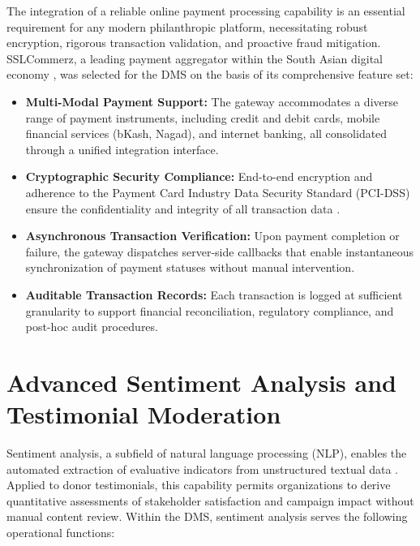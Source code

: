 \documentclass{thesis-library}
\begin{document}
The integration of a reliable online payment processing capability is an essential requirement for any modern philanthropic platform, necessitating robust encryption, rigorous transaction validation, and proactive fraud mitigation. SSLCommerz, a leading payment aggregator within the South Asian digital economy \cite{hossain2019e}, was selected for the DMS on the basis of its comprehensive feature set:
\begin{itemize}
    \item \textbf{Multi-Modal Payment Support:} The gateway accommodates a diverse range of payment instruments, including credit and debit cards, mobile financial services (bKash, Nagad), and internet banking, all consolidated through a unified integration interface.
    \item \textbf{Cryptographic Security Compliance:} End-to-end encryption and adherence to the Payment Card Industry Data Security Standard (PCI-DSS) ensure the confidentiality and integrity of all transaction data \cite{owasp2021top10}.
    \item \textbf{Asynchronous Transaction Verification:} Upon payment completion or failure, the gateway dispatches server-side callbacks that enable instantaneous synchronization of payment statuses without manual intervention.
    \item \textbf{Auditable Transaction Records:} Each transaction is logged at sufficient granularity to support financial reconciliation, regulatory compliance, and post-hoc audit procedures.
\end{itemize}

\section{Advanced Sentiment Analysis and Testimonial Moderation}

Sentiment analysis, a subfield of natural language processing (NLP), enables the automated extraction of evaluative indicators from unstructured textual data \cite{hutto2014vader}. Applied to donor testimonials, this capability permits organizations to derive quantitative assessments of stakeholder satisfaction and campaign impact without manual content review. Within the DMS, sentiment analysis serves the following operational functions:
\end{document}
